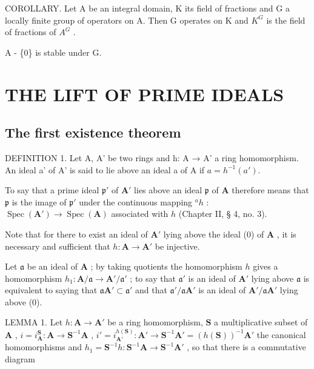 COROLLARY. Let A be an integral domain, K its field of fractions and G a locally finite group of operators on A. Then G operates on K and \(K^{G}\) is the field of fractions of \(A^{G}\) .

A - \{0\} is stable under G.

\section{THE LIFT OF PRIME IDEALS}

\subsection{The first existence theorem}

DEFINITION 1. Let A, A' be two rings and h: A → A' a ring homomorphism. An ideal a' of A' is said to lie above an ideal a of A if \(a = h^{-1}(a')\).

To say that a prime ideal \(\mathfrak{p}'\) of \(\mathbf{A}'\) lies above an ideal \(\mathfrak{p}\) of \(\mathbf{A}\) therefore means that \(\mathfrak{p}\) is the image of \(\mathfrak{p}'\) under the continuous mapping \(^a h\) : \(\operatorname{Spec}(\mathbf{A}') \to \operatorname{Spec}(\mathbf{A})\) associated with \(h\) (Chapter II, § 4, no. 3).

Note that for there to exist an ideal of \(\mathbf{A}'\) lying above the ideal (0) of \(\mathbf{A}\) , it is necessary and sufficient that \(h: \mathbf{A} \to \mathbf{A}'\) be injective.

Let \(\mathfrak{a}\) be an ideal of \(\mathbf{A}\) ; by taking quotients the homomorphism \(h\) gives a homomorphism \(h_1: \mathbf{A} / \mathfrak{a} \to \mathbf{A}' / \mathfrak{a}'\) ; to say that \(\mathfrak{a}'\) is an ideal of \(\mathbf{A}'\) lying above \(\mathfrak{a}\) is equivalent to saying that \(\mathfrak{a}\mathbf{A}' \subset \mathfrak{a}'\) and that \(\mathfrak{a}' / \mathfrak{a}\mathbf{A}'\) is an ideal of \(\mathbf{A}' / \mathfrak{a}\mathbf{A}'\) lying above (0).

LEMMA 1. Let \(h: \mathbf{A} \to \mathbf{A}'\) be a ring homomorphism, \(\mathbf{S}\) a multiplicative subset of \(\mathbf{A}\) , \(i = i_{\mathbf{A}}^{\mathbf{S}}: \mathbf{A} \to \mathbf{S}^{-1}\mathbf{A}\) , \(i' = i_{\mathbf{A}'}^{h(\mathbf{S})}: \mathbf{A}' \to \mathbf{S}^{-1}\mathbf{A}' = (h(\mathbf{S}))^{-1}\mathbf{A}'\) the canonical homomorphisms and \(h_1 = \mathbf{S}^{-1}h: \mathbf{S}^{-1}\mathbf{A} \to \mathbf{S}^{-1}\mathbf{A}'\) , so that there is a commutative diagram

